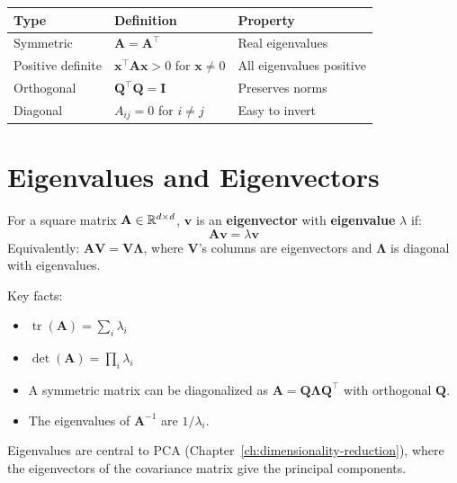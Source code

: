 \begin{longtable}{p{3cm}p{5cm}p{4cm}}
	\toprule
	\textbf{Type}     & \textbf{Definition}                                                 & \textbf{Property}        \\
	\midrule
	Symmetric         & $\mathbf{A} = \mathbf{A}^\top$                                      & Real eigenvalues         \\
	Positive definite & $\mathbf{x}^\top \mathbf{A} \mathbf{x} > 0$ for $\mathbf{x} \neq 0$ & All eigenvalues positive \\
	Orthogonal        & $\mathbf{Q}^\top \mathbf{Q} = \mathbf{I}$                           & Preserves norms          \\
	Diagonal          & $A_{ij} = 0$ for $i \neq j$                                         & Easy to invert           \\
	\bottomrule
\end{longtable}

\section{Eigenvalues and Eigenvectors}

\begin{definition}
	For a square matrix $\mathbf{A} \in \mathbb{R}^{d \times d}$, $\mathbf{v}$ is an \textbf{eigenvector} with \textbf{eigenvalue} $\lambda$ if:
	\[
		\mathbf{A} \mathbf{v} = \lambda \mathbf{v}
	\]
	Equivalently: $\mathbf{A} \mathbf{V} = \mathbf{V} \boldsymbol{\Lambda}$, where $\mathbf{V}$'s columns are eigenvectors and $\boldsymbol{\Lambda}$ is diagonal with eigenvalues.
\end{definition}

Key facts:
\begin{itemize}
	\item $\operatorname{tr}(\mathbf{A}) = \sum_i \lambda_i$
	\item $\det(\mathbf{A}) = \prod_i \lambda_i$
	\item A symmetric matrix can be diagonalized as $\mathbf{A} = \mathbf{Q} \boldsymbol{\Lambda} \mathbf{Q}^\top$ with orthogonal $\mathbf{Q}$.
	\item The eigenvalues of $\mathbf{A}^{-1}$ are $1/\lambda_i$.
\end{itemize}

Eigenvalues are central to PCA (Chapter~\ref{ch:dimensionality-reduction}), where the eigenvectors of the covariance matrix give the principal components.

